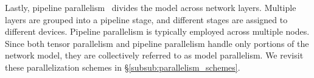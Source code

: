 Lastly, pipeline parallelism~\cite{narayanan2019pipedream,yang2021pipemare,narayanan2021pipe2bw} divides the model across network layers.
Multiple layers are grouped into a pipeline stage, and different stages are assigned to different devices.
Pipeline parallelism is typically employed across multiple nodes.
Since both tensor parallelism and pipeline parallelism handle only portions of the network model, they are collectively referred to as model parallelism.
We revisit these parallelization schemes in \S\ref{subsub:parallelism_schemes}.
